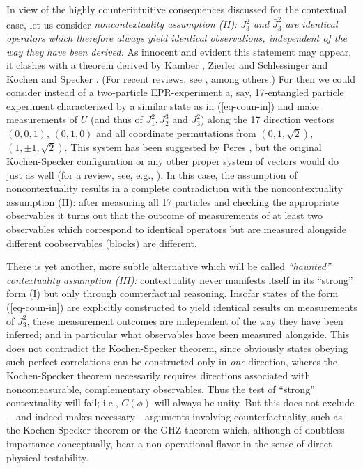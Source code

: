 In view of the highly counterintuitive consequences discussed for the
contextual case, let us consider
{\em noncontextuality assumption (II):
$J_3^2$ and
$\bar J^2_3$ are identical operators which therefore {\em always yield
identical} observations, independent of the way they have been derived.}
As innocent and evident this statement may appear, it clashes with a
theorem derived by
Kamber \cite{kamber65}, Zierler and Schlessinger \cite{ZirlSchl-65} and
Kochen and Specker
\cite{kochen1}. (For recent reviews, see
\cite{redhead,peres,mermin-93,svozil-tkadlec,svozil-ql}, among others.)
For then we could consider instead of a two-particle EPR-experiment
a, say, 17-entangled particle experiment characterized by a similar
state as in
(\ref{eq-coun-in})
and make measurements of $U$ (and thus of  $J_1^2,J_2^3$ and $J_3^2$) along  the 17
direction vectors $(0,0,1)$,  $(0,1,0)$
and all coordinate permutations from $(0,1,\sqrt2)$, $(1,\pm1,\sqrt2)$. This system
has been
suggested by Peres \cite{peres-91,peres}, but the original Kochen-Specker configuration
or any other proper system of vectors would do just as well (for a review, see,
e.g., \cite{mermin-93,svozil-tkadlec,svozil-ql}).
In this case, the assumption of noncontextuality results in a complete
contradiction with the noncontextuality assumption (II):
after measuring all 17 particles and checking the appropriate
observables it turns out that the outcome of measurements of at least
two observables which
correspond to identical operators but are measured alongside different
coobservables (blocks) are different.

There is yet another, more subtle alternative which will be called
{\em ``haunted'' contextuality assumption (III): }
contextuality never manifests itself in its ``strong'' form (I) but only through counterfactual
reasoning. Insofar states of the form (\ref{eq-coun-in}) are explicitly
constructed to yield identical results on measurements of $J_3^2$,
these measurement outcomes are independent of the way they have been
inferred;  and in particular what observables have been measured
alongside. This does not contradict the Kochen-Specker theorem, since
obviously states obeying such perfect correlations can be constructed
only in {\em one} direction, wheres the Kochen-Specker theorem necessarily requires
directions associated with noncomeasurable, complementary observables.
Thus the test of ``strong'' contextuality
will fail; i.e., $C(\phi )$ will always be unity. But this does not
exclude---and indeed makes necessary---arguments involving
counterfactuality, such as the Kochen-Specker theorem or the
GHZ-theorem which, although of doubtless importance conceptually,
bear a non-operational flavor
in the sense of direct physical testability.



